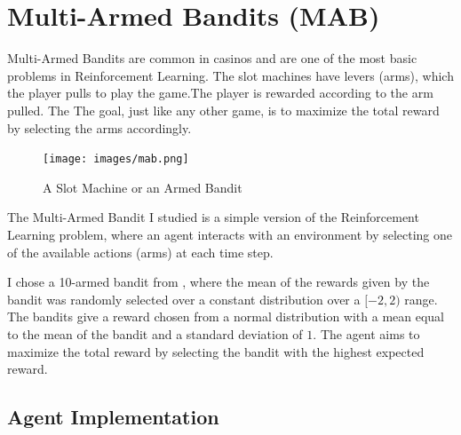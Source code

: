 \section{Multi-Armed Bandits (MAB)}


Multi-Armed Bandits are common in casinos and are one of the most basic problems in Reinforcement Learning. The slot machines have levers (arms), which the player pulls to play the game.The player is rewarded according to the arm pulled. The  The goal, just like any other game, is to maximize the total reward by selecting the arms accordingly.

\begin{figure}[h]
    \centering
    \texttt{[image: images/mab.png]}
    \caption{A Slot Machine or an Armed Bandit}
    \label{fig:mab}
\end{figure}

The Multi-Armed Bandit I studied is a simple version of the Reinforcement Learning problem, where an agent interacts with an environment by selecting one of the available actions (arms) at each time step.

I chose a 10-armed bandit from \cite{sutton2018reinforcement}, where the mean of the rewards given by the bandit was randomly selected over a constant distribution over a $[-2,2)$ range. The bandits give a reward chosen from a normal distribution with a mean equal to the mean of the bandit and a standard deviation of $1$. The agent aims to maximize the total reward by selecting the bandit with the highest expected reward.

\subsection{Agent Implementation}

